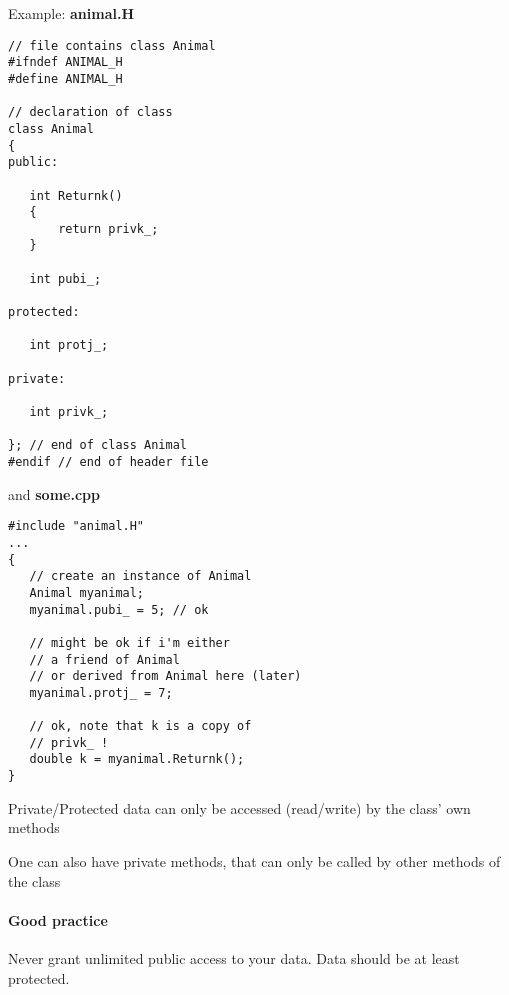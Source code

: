 Example: \textbf{animal.H}\\
\begin{boxedminipage}{\linewidth}
\begin{verbatim}
// file contains class Animal
#ifndef ANIMAL_H
#define ANIMAL_H

// declaration of class
class Animal
{
public:

   int Returnk()
   {
       return privk_;
   }
   
   int pubi_;

protected:

   int protj_;

private:

   int privk_;

}; // end of class Animal
#endif // end of header file
\end{verbatim}
\end{boxedminipage}
and \textbf{some.cpp}\\
\begin{boxedminipage}{\linewidth}
\begin{verbatim}
#include "animal.H"
...
{
   // create an instance of Animal
   Animal myanimal;
   myanimal.pubi_ = 5; // ok

   // might be ok if i'm either
   // a friend of Animal
   // or derived from Animal here (later)
   myanimal.protj_ = 7;

   // ok, note that k is a copy of
   // privk_ !
   double k = myanimal.Returnk();
}
\end{verbatim}
\end{boxedminipage}
Private/Protected data can only be accessed
(read/write) by the class' own methods

One can also have private methods, that can
only be called by other methods of the class

\paragraph{Good practice}
Never grant unlimited public access
to your data.
Data should be at least protected.

